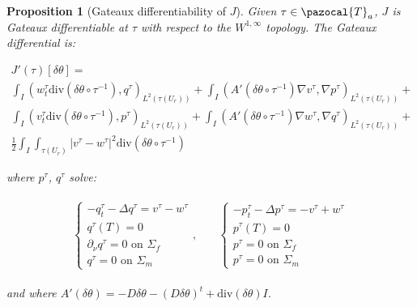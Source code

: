 \documentclass[english,a4paper,9pt,oneside]{scrbook}	%
\theoremstyle{break}
\newtheorem{prop}[equation]{Proposition}
\theoremstyle{remark}
\newcommand{\cT}{\pazocal{T}}
\newcommand{\te}{\theta}
\newcommand{\dive}{\text{div}}
\begin{document}
\begin{prop}[Gateaux differentiability of $J$]
\label{prop:gateaux_diff}
Given $\tau \in \cT_a$, $J$ is Gateaux differentiable at $\tau$ with respect to the $W^{1,\infty}$ topology. The Gateaux differential is:


\begin{align*}
J'(\tau)[\delta \te] =\\ \int_I (w_t^\tau \dive(\delta \te\circ  \tau^{-1}), q^\tau )_{L^2(\tau(U_r))}+ \int_I (A'(\delta\te \circ \tau^{-1})\nabla v^\tau, \nabla p^\tau)_{L^2(\tau(U_r))}+\\
\int_I (v_t^\tau \dive(\delta \te\circ  \tau^{-1}), p^\tau )_{L^2(\tau(U_r))}+ \int_I (A'(\delta\te \circ \tau^{-1})\nabla w^\tau, \nabla q^\tau)_{L^2(\tau(U_r))}+\\
\frac{1}{2}\int_I\int_{\tau(U_r)}|v^\tau-w^\tau|^2\dive(\delta \te\circ  \tau^{-1})
\end{align*}

where $p^\tau$, $q^\tau$ solve:

\begin{align*}
\begin{matrix}
\left\{\begin{matrix}
-q^\tau_t-\Delta q^\tau =v^\tau-w^\tau\\
q^\tau(T)=0\\
\partial_\nu q^\tau = 0 \text{ on } \Sigma_f\\
q^\tau = 0 \text{ on } \Sigma_m
\end{matrix}\right., \quad & \left\{\begin{matrix}
-p^\tau_t-\Delta p^\tau = - v^\tau+ w^\tau \\
p^\tau(T)=0\\
p^\tau = 0 \text{ on } \Sigma_f \\
p^\tau = 0 \text{ on } \Sigma_m
\end{matrix}\right.
\end{matrix}
\end{align*}

and where $A'(\delta\te )= - D\delta \te -(D\delta\te)^t + \dive(\delta\te)I$.

\end{prop}
\end{document}
